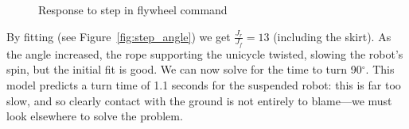 \documentclass{IIBproject}
\begin{document}
\begin{figure}[htbp]
  \begin{center}
    \end{center}
    \caption{Response to step in flywheel command}
    \end{figure}

By fitting (see Figure~\ref{fig:step_angle}) we get $\frac{J_r}{J_f} = 13$
(including the skirt). As the angle increased, the rope supporting the
unicycle twisted, slowing the robot's spin, but the initial fit is good.  We
can now solve for the time to turn 90$^\circ$. This model predicts a turn time
of 1.1 seconds for the suspended robot: this is far too slow, and so clearly
contact with the ground is not entirely to blame---we must look elsewhere to
solve the problem.
\end{document}
